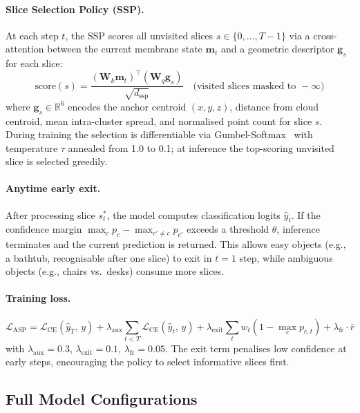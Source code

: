 \documentclass[11pt,a4paper]{article}
\begin{document}
\paragraph{Slice Selection Policy (SSP).}
At each step $t$, the SSP scores all unvisited slices $s \in \{0,\ldots,T-1\}$
via a cross-attention between the current membrane state $\mathbf{m}_t$ and a
geometric descriptor $\mathbf{g}_s$ for each slice:
\begin{equation}
  \text{score}(s) = \frac{(\mathbf{W}_k \mathbf{m}_t)^\top (\mathbf{W}_q \mathbf{g}_s)}
                         {\sqrt{d_\text{ssp}}}
  \quad \text{(visited slices masked to } -\infty\text{)}
  \label{eq:ssp}
\end{equation}
where $\mathbf{g}_s \in \mathbb{R}^6$ encodes the anchor centroid $(x,y,z)$,
distance from cloud centroid, mean intra-cluster spread, and normalised point
count for slice $s$. During training the selection is differentiable via
Gumbel-Softmax~\cite{gumbel} with temperature $\tau$ annealed from 1.0 to 0.1;
at inference the top-scoring unvisited slice is selected greedily.

\paragraph{Anytime early exit.}
After processing slice $s^*_t$, the model computes classification logits
$\hat{y}_t$. If the confidence margin
$\max_c p_c - \max_{c' \neq c} p_{c'}$ exceeds a threshold $\theta$, inference
terminates and the current prediction is returned. This allows easy objects
(e.g., a bathtub, recognisable after one slice) to exit in $t=1$ step, while
ambiguous objects (e.g., chairs vs.\ desks) consume more slices.

\paragraph{Training loss.}
\begin{equation}
  \mathcal{L}_\text{ASP}
  = \mathcal{L}_\text{CE}(\hat{y}_T,\, y)
  + \lambda_\text{aux} \sum_{t<T} \mathcal{L}_\text{CE}(\hat{y}_t,\, y)
  + \lambda_\text{exit} \sum_t w_t (1 - \max_c p_{c,t})
  + \lambda_\text{fr} \cdot \bar{r}
  \label{eq:asp_loss}
\end{equation}
with $\lambda_\text{aux}=0.3$, $\lambda_\text{exit}=0.1$, $\lambda_\text{fr}=0.05$.
The exit term penalises low confidence at early steps, encouraging the policy to
select informative slices first.

\subsection{Full Model Configurations}
\end{document}
